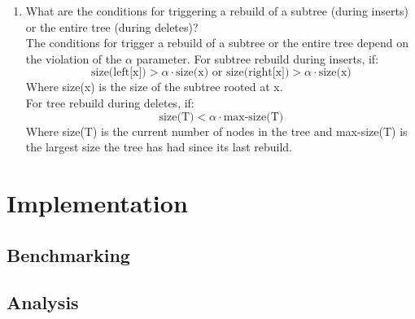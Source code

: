 \documentclass{labReport}
\begin{document}
\begin{enumerate}
    \item What are the conditions for triggering a rebuild of a subtree (during inserts) or the entire tree (during deletes)?\\
    The conditions for trigger a rebuild of a subtree or the entire tree depend on the violation of the $\alpha$ parameter. For subtree rebuild during inserts, if: \\
    \[
    \text{size(left[x])} > \alpha \cdot \text{size(x)} \text{ or } \text{size(right[x])} > \alpha \cdot \text{size(x)}
    \]
    Where size(x) is the size of the subtree rooted at x. \\
    For tree rebuild during deletes, if: \\
    \[
    \text{size(T)} < \alpha \cdot \text{max-size(T)}
    \]
    Where size(T) is the current number of nodes in the tree and max-size(T) is the largest size the tree has had since its last rebuild.

\end{enumerate}

\section{Implementation}



\subsection{Benchmarking}

\subsection{Analysis}


\end{document}
